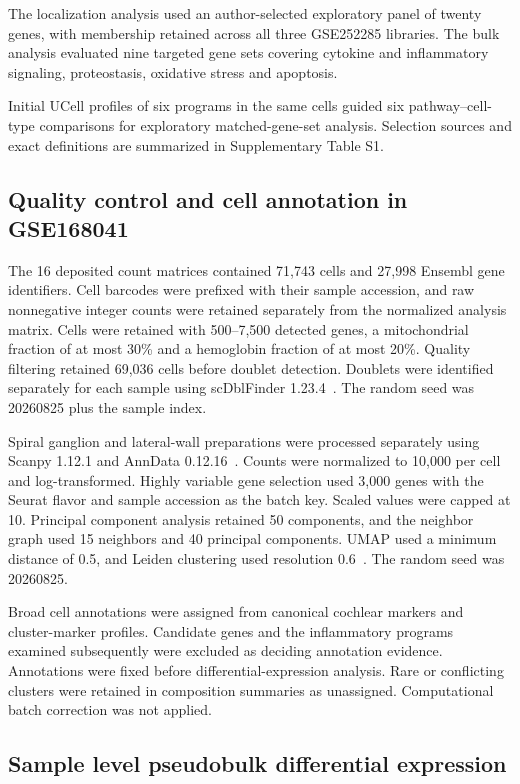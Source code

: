 The localization analysis used an author-selected exploratory panel of twenty genes, with membership retained across all three GSE252285 libraries. The bulk analysis evaluated nine targeted gene sets covering cytokine and inflammatory signaling, proteostasis, oxidative stress and apoptosis.

Initial UCell profiles of six programs in the same cells guided six pathway--cell-type comparisons for exploratory matched-gene-set analysis. Selection sources and exact definitions are summarized in Supplementary Table S1.

\subsection{Quality control and cell annotation in GSE168041}

The 16 deposited count matrices contained 71,743 cells and 27,998 Ensembl gene identifiers. Cell barcodes were prefixed with their sample accession, and raw nonnegative integer counts were retained separately from the normalized analysis matrix. Cells were retained with 500--7,500 detected genes, a mitochondrial fraction of at most 30\% and a hemoglobin fraction of at most 20\%. Quality filtering retained 69,036 cells before doublet detection. Doublets were identified separately for each sample using scDblFinder 1.23.4~\citep{Germain2022}. The random seed was 20260825 plus the sample index.

Spiral ganglion and lateral-wall preparations were processed separately using Scanpy 1.12.1 and AnnData 0.12.16~\citep{Wolf2018}. Counts were normalized to 10,000 per cell and log-transformed. Highly variable gene selection used 3,000 genes with the Seurat flavor and sample accession as the batch key. Scaled values were capped at 10. Principal component analysis retained 50 components, and the neighbor graph used 15 neighbors and 40 principal components. UMAP used a minimum distance of 0.5, and Leiden clustering used resolution 0.6~\citep{Traag2019}. The random seed was 20260825.

Broad cell annotations were assigned from canonical cochlear markers and cluster-marker profiles. Candidate genes and the inflammatory programs examined subsequently were excluded as deciding annotation evidence. Annotations were fixed before differential-expression analysis. Rare or conflicting clusters were retained in composition summaries as unassigned. Computational batch correction was not applied.

\subsection{Sample level pseudobulk differential expression}

